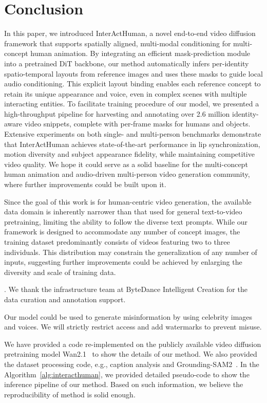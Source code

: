 \documentclass{article} %
\begin{document}
\section{Conclusion}
In this paper, we introduced InterActHuman, a novel end-to-end video diffusion framework that supports spatially aligned, multi-modal conditioning for multi-concept human animation. By integrating an efficient mask-prediction module into a pretrained DiT backbone, our method automatically infers per-identity spatio-temporal layouts from reference images and uses these masks to guide local audio conditioning. This explicit layout binding enables each reference concept to retain its unique appearance and voice, even in complex scenes with multiple interacting entities. To facilitate training procedure of our model, we presented a high-throughput pipeline for harvesting and annotating over 2.6 million identity-aware video snippets, complete with per-frame masks for humans and objects. Extensive experiments on both single- and multi-person benchmarks demonstrate that InterActHuman achieves state-of-the-art performance in lip synchronization, motion diversity and subject appearance fidelity, while maintaining competitive video quality. We hope it could serve as a solid baseline for the multi-concept human animation and audio-driven multi-person video generation community, where further improvements could be built upon it.

Since the goal of this work is for human-centric video generation, the available data domain is inherently narrower than that used for general text-to-video pretraining, limiting the ability to follow the diverse text prompts. While our framework is designed to accommodate any number of concept images, the training dataset predominantly consists of videos featuring two to three individuals. This distribution may constrain the generalization of any number of inputs, suggesting further improvements could be achieved by enlarging the diversity and scale of training data.

. We thank the infrastructure team at ByteDance Intelligent Creation for the data curation and annotation support.

 Our model could be used to generate misinformation by using celebrity images and voices. We will strictly restrict access and add watermarks to prevent misuse.

 We have provided a code re-implemented on the publicly available video diffusion pretraining model Wan2.1~\citep{wang2025wan} to show the details of our method. We also provided the dataset processing code, e.g., caption analysis and Grounding-SAM2~\citep{ren2024grounded}. In the Algorithm~\ref{alg:interacthuman}, we provided detailed pseudo-code to show the inference pipeline of our method. Based on such information, we believe the reproducibility of method is solid enough.
\clearpage


\appendix
\end{document}
